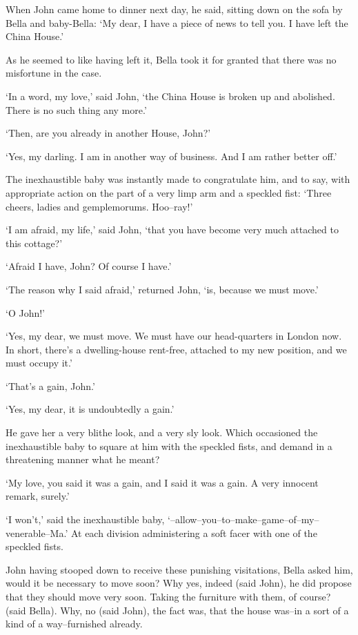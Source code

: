 When John came home to dinner next day, he said, sitting down on the
sofa by Bella and baby-Bella: ‘My dear, I have a piece of news to tell
you. I have left the China House.’

As he seemed to like having left it, Bella took it for granted that
there was no misfortune in the case.

‘In a word, my love,’ said John, ‘the China House is broken up and
abolished. There is no such thing any more.’

‘Then, are you already in another House, John?’

‘Yes, my darling. I am in another way of business. And I am rather
better off.’

The inexhaustible baby was instantly made to congratulate him, and
to say, with appropriate action on the part of a very limp arm and a
speckled fist: ‘Three cheers, ladies and gemplemorums. Hoo--ray!’

‘I am afraid, my life,’ said John, ‘that you have become very much
attached to this cottage?’

‘Afraid I have, John? Of course I have.’

‘The reason why I said afraid,’ returned John, ‘is, because we must
move.’

‘O John!’

‘Yes, my dear, we must move. We must have our head-quarters in London
now. In short, there’s a dwelling-house rent-free, attached to my new
position, and we must occupy it.’

‘That’s a gain, John.’

‘Yes, my dear, it is undoubtedly a gain.’

He gave her a very blithe look, and a very sly look. Which occasioned
the inexhaustible baby to square at him with the speckled fists, and
demand in a threatening manner what he meant?

‘My love, you said it was a gain, and I said it was a gain. A very
innocent remark, surely.’

‘I won’t,’ said the inexhaustible baby,
‘--allow--you--to--make--game--of--my--venerable--Ma.’ At each division
administering a soft facer with one of the speckled fists.

John having stooped down to receive these punishing visitations, Bella
asked him, would it be necessary to move soon? Why yes, indeed (said
John), he did propose that they should move very soon. Taking the
furniture with them, of course? (said Bella). Why, no (said John), the
fact was, that the house was--in a sort of a kind of a way--furnished
already.

